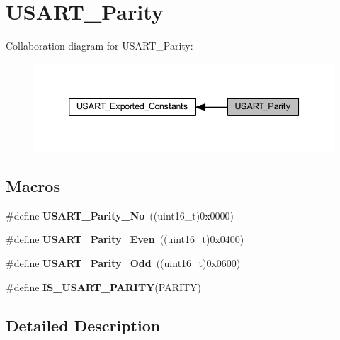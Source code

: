 \hypertarget{group___u_s_a_r_t___parity}{}\section{U\+S\+A\+R\+T\+\_\+\+Parity}
\label{group___u_s_a_r_t___parity}
Collaboration diagram for U\+S\+A\+R\+T\+\_\+\+Parity\+:
\nopagebreak
\begin{figure}[H]
\begin{center}
\leavevmode
\includegraphics[width=339pt]{group___u_s_a_r_t___parity}
\end{center}
\end{figure}
\subsection*{Macros}
\begin{DoxyCompactItemize}
\item 
\mbox{\label{group___u_s_a_r_t___parity_gab9deebcb0a859360dfec85074abaa3aa}} 
\#define {\bfseries U\+S\+A\+R\+T\+\_\+\+Parity\+\_\+\+No}~((uint16\+\_\+t)0x0000)
\item 
\mbox{\label{group___u_s_a_r_t___parity_ga62193247d36fffe982e159c1f246271e}} 
\#define {\bfseries U\+S\+A\+R\+T\+\_\+\+Parity\+\_\+\+Even}~((uint16\+\_\+t)0x0400)
\item 
\mbox{\label{group___u_s_a_r_t___parity_gafcd68937a6b4b8ffff8f96e68d6a5ecd}} 
\#define {\bfseries U\+S\+A\+R\+T\+\_\+\+Parity\+\_\+\+Odd}~((uint16\+\_\+t)0x0600)
\item 
\#define {\bfseries I\+S\+\_\+\+U\+S\+A\+R\+T\+\_\+\+P\+A\+R\+I\+TY}(P\+A\+R\+I\+TY)
\end{DoxyCompactItemize}


\subsection{Detailed Description}


